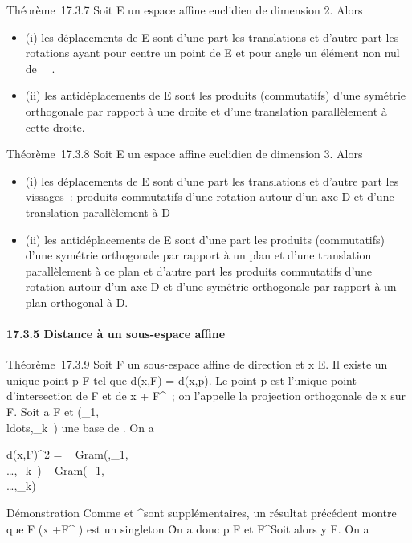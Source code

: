 \documentclass[]{article}
\begin{document}
Théorème~17.3.7 Soit E un espace affine euclidien de dimension 2. Alors

\begin{itemize}
\itemsep1pt\parskip0pt
\item
  (i) les déplacements de E sont d'une part les translations et d'autre
  part les rotations ayant pour centre un point de E et pour angle un
  élément non nul de ~\pi~.
\item
  (ii) les antidéplacements de E sont les produits (commutatifs) d'une
  symétrie orthogonale par rapport à une droite et d'une translation
  parallèlement à cette droite.
\end{itemize}

Théorème~17.3.8 Soit E un espace affine euclidien de dimension 3. Alors

\begin{itemize}
\itemsep1pt\parskip0pt
\item
  (i) les déplacements de E sont d'une part les translations et d'autre
  part les vissages~: produits commutatifs d'une rotation autour d'un
  axe D et d'une translation parallèlement à D
\item
  (ii) les antidéplacements de E sont d'une part les produits
  (commutatifs) d'une symétrie orthogonale par rapport à un plan et
  d'une translation parallèlement à ce plan et d'autre part les produits
  commutatifs d'une rotation autour d'un axe D et d'une symétrie
  orthogonale par rapport à un plan orthogonal à D.
\end{itemize}

\paragraph{17.3.5 Distance à un sous-espace affine}

Théorème~17.3.9 Soit F un sous-espace affine de direction
\overrightarrowF et x \in E. Il existe un unique point
p \in F tel que d(x,F) = d(x,p). Le point p est l'unique point
d'intersection de F et de x +\overrightarrow
F^\bot~; on l'appelle la projection orthogonale de x sur F.
Soit a \in F et
(\vece_1,\\ldots,\vece_k~)
une base de \overrightarrowF. On a

d(x,F)^2 =
~
Gram(\overrightarrowax,\vece_1,\\\ldots,\vece_k~)
\over
{}~
Gram(\vece_1,\\\ldots,\vece_k)~

Démonstration Comme \overrightarrowF et
\overrightarrowF^\bot sont supplémentaires,
un résultat précédent montre que F \bigcap\left (x
+\overrightarrow F^\bot\right
) est un singleton \p\. On a donc p \in
F et \overrightarrowxp
\in\overrightarrow F^\bot Soit alors y \in F. On
a
\end{document}
